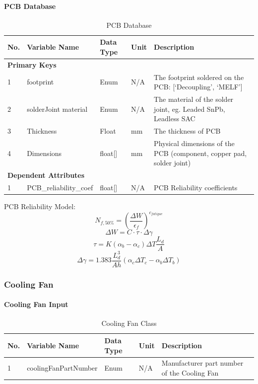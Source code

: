 \documentclass{article}
\begin{document}
\paragraph{PCB Database}
\begin{table}[h]
\centering
\caption{PCB Database}
\begin{tabular}{|l|l|l|l|p{6cm}|}
\hline
\textbf{No.} & \textbf{Variable Name} & \textbf{Data Type} & \textbf{Unit} & \textbf{Description} \\ \hline
\multicolumn{5}{|l|}{\textbf{Primary Keys}} \\ \hline
1 & footprint & Enum & N/A & The footprint soldered on the PCB: [`Decoupling', `MELF'] \\ \hline
2 & solderJoint material & Enum & N/A & The material of the solder joint, eg. Leaded SnPb, Leadless SAC \\ \hline
3 & Thickness & Float & mm & The thickness of PCB \\ \hline
4 & Dimensions & float[] & mm & Physical dimensions of the PCB (component, copper pad, solder joint) \\ \hline
\multicolumn{5}{|l|}{\textbf{Dependent Attributes}} \\ \hline
1 & PCB\_reliability\_coef & float[] & N/A & PCB Reliability coefficients \\ \hline
\end{tabular}
\end{table}

PCB Reliability Model:
\begin{equation}
N_{f,50\%} = \left(\frac{\Delta W}{\epsilon_f}\right)^{c_{fatigue}}
\end{equation}
\begin{equation}
\Delta W = C \cdot \tau \cdot \Delta \gamma
\end{equation}
\begin{equation}
\tau = K(\alpha_b - \alpha_c)\Delta T \frac{L_d}{A}
\end{equation}
\begin{equation}
\Delta \gamma = 1.383 \frac{L_d^3}{A h} (\alpha_c \Delta T_c - \alpha_b \Delta T_b)
\end{equation}

\subsubsection{Cooling Fan}
\paragraph{Cooling Fan Input}
\begin{table}[h]
\centering
\caption{Cooling Fan Class}
\begin{tabular}{|l|l|l|l|p{6cm}|}
\hline
\textbf{No.} & \textbf{Variable Name} & \textbf{Data Type} & \textbf{Unit} & \textbf{Description} \\ \hline
1 & coolingFanPartNumber & Enum & N/A & Manufacturer part number of the Cooling Fan \\ \hline
\end{tabular}
\end{table}
\end{document}
